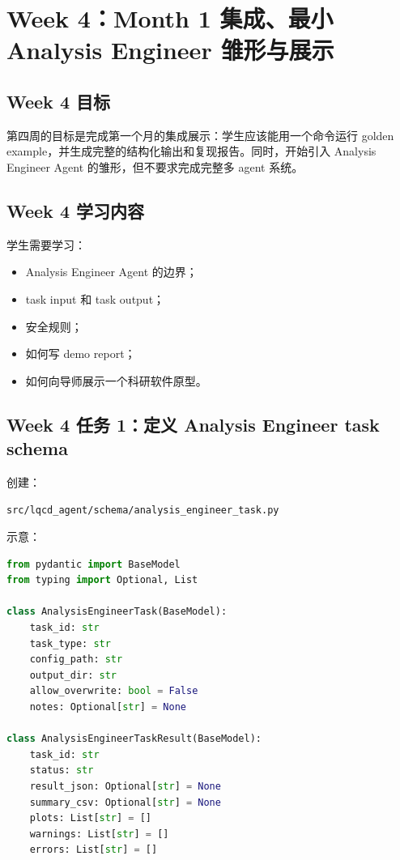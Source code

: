 \documentclass[11pt,a4paper,fontset=fandol]{ctexart}
\begin{document}
\section{Week 4：Month 1 集成、最小 Analysis Engineer 雏形与展示}

\subsection{Week 4 目标}

第四周的目标是完成第一个月的集成展示：学生应该能用一个命令运行 golden example，并生成完整的结构化输出和复现报告。同时，开始引入 Analysis Engineer Agent 的雏形，但不要求完成完整多 agent 系统。

\subsection{Week 4 学习内容}

学生需要学习：

\begin{itemize}[leftmargin=2em]
  \item Analysis Engineer Agent 的边界；
  \item task input 和 task output；
  \item 安全规则；
  \item 如何写 demo report；
  \item 如何向导师展示一个科研软件原型。
\end{itemize}

\subsection{Week 4 任务 1：定义 Analysis Engineer task schema}

创建：

\begin{lstlisting}
src/lqcd_agent/schema/analysis_engineer_task.py
\end{lstlisting}

示意：

\begin{lstlisting}[language=Python]
from pydantic import BaseModel
from typing import Optional, List

class AnalysisEngineerTask(BaseModel):
    task_id: str
    task_type: str
    config_path: str
    output_dir: str
    allow_overwrite: bool = False
    notes: Optional[str] = None

class AnalysisEngineerTaskResult(BaseModel):
    task_id: str
    status: str
    result_json: Optional[str] = None
    summary_csv: Optional[str] = None
    plots: List[str] = []
    warnings: List[str] = []
    errors: List[str] = []
\end{lstlisting}
\end{document}
